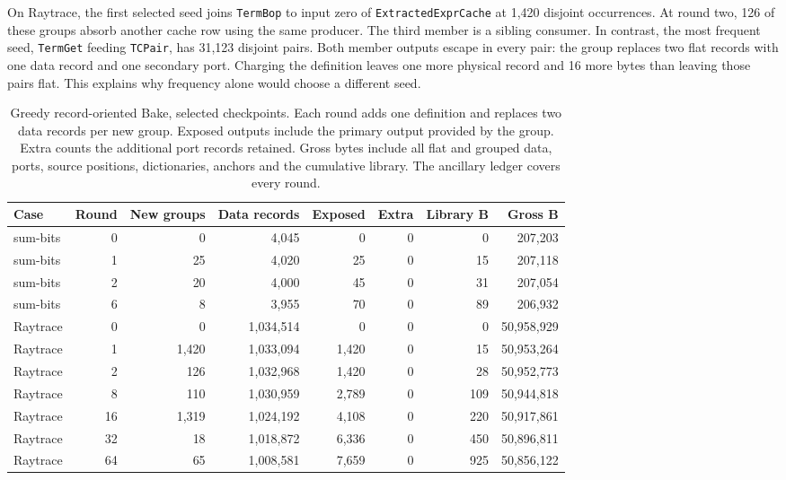 On Raytrace, the first selected seed joins \texttt{TermBop} to input zero of \texttt{ExtractedExprCache} at 1,420 disjoint occurrences. At round two, 126 of these groups absorb another cache row using the same producer. The third member is a sibling consumer. In contrast, the most frequent seed, \texttt{TermGet} feeding \texttt{TCPair}, has 31,123 disjoint pairs. Both member outputs escape in every pair: the group replaces two flat records with one data record and one secondary port. Charging the definition leaves one more physical record and 16 more bytes than leaving those pairs flat. This explains why frequency alone would choose a different seed.

\begin{table}[ht]
\centering\small
\caption{Greedy record-oriented Bake, selected checkpoints. Each round adds one definition and replaces two data records per new group. Exposed outputs include the primary output provided by the group. Extra counts the additional port records retained. Gross bytes include all flat and grouped data, ports, source positions, dictionaries, anchors and the cumulative library. The ancillary ledger covers every round.}
\label{tab:record-bake}
\begin{tabular}{lrrrrrrr}
\toprule
Case & Round & New groups & Data records & Exposed & Extra & Library B & Gross B\\
\midrule
sum-bits & 0 & 0 & 4,045 & 0 & 0 & 0 & 207,203 \\
sum-bits & 1 & 25 & 4,020 & 25 & 0 & 15 & 207,118 \\
sum-bits & 2 & 20 & 4,000 & 45 & 0 & 31 & 207,054 \\
sum-bits & 6 & 8 & 3,955 & 70 & 0 & 89 & 206,932 \\
\midrule
Raytrace & 0 & 0 & 1,034,514 & 0 & 0 & 0 & 50,958,929 \\
Raytrace & 1 & 1,420 & 1,033,094 & 1,420 & 0 & 15 & 50,953,264 \\
Raytrace & 2 & 126 & 1,032,968 & 1,420 & 0 & 28 & 50,952,773 \\
Raytrace & 8 & 110 & 1,030,959 & 2,789 & 0 & 109 & 50,944,818 \\
Raytrace & 16 & 1,319 & 1,024,192 & 4,108 & 0 & 220 & 50,917,861 \\
Raytrace & 32 & 18 & 1,018,872 & 6,336 & 0 & 450 & 50,896,811 \\
Raytrace & 64 & 65 & 1,008,581 & 7,659 & 0 & 925 & 50,856,122 \\
\bottomrule
\end{tabular}
\end{table}

